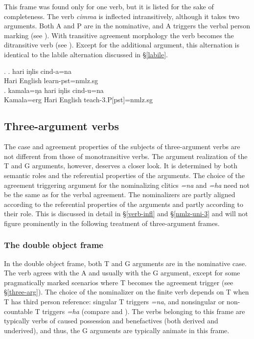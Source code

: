 
\noindent
This frame was found only for one verb, but it is listed for the sake of completeness. The verb \emph{cimma}  is inflected intransitively, although it takes two arguments. Both A and P are in the nominative, and  A triggers the verbal person marking (see  \Next[a]). With transitive agreement morphology the verb becomes the ditransitive verb  (see \Next[b]). Except for the additional argument, this alternation is identical to the labile alternation discussed in §\ref{labile}. 

\ex. \ag. hari iŋlis cind-a=na\\
		Hari English learn{\sc [3sg]-pst=nmlz.sg}	\\
 	\bg. kamala=ŋa hari iŋlis cind-u=na\\
	Kamala{\sc =erg} Hari English teach{\sc -3.P[pst]=nmlz.sg}		\\

\subsection{Three-argument verbs}\label{three-arg-frame}

The case and agreement properties of the subjects of three-argument verbs are not different from those of monotransitive verbs. The argument realization of the T and G arguments, however, deserves a closer look. It is determined  by both semantic roles and the referential properties of the arguments.  The choice of the agreement triggering argument for the nominalizing clitics \emph{=na} and \emph{=ha} need not be the same as for the verbal agreement. The nominalizers are partly aligned according to the referential properties of the arguments and partly according to their role. This is discussed in detail in §\ref{verb-infl} and §\ref{nmlz-uni-3} and will not figure prominently in the following treatment of three-argument frames.
 
\subsubsection{The double object frame}


\noindent
In the double object frame, both T and G arguments are in the nominative case. The verb agrees with the A and usually with the G argument, except for some pragmatically marked scenarios where T becomes the agreement trigger (see §\ref{three-arg}). The choice of the nominalizer on the finite verb depends on T when T has third person reference: singular T triggers \emph{=na}, and nonsingular or non-countable T triggers \emph{=ha} (compare \Next[b] and \Next[c]). The verbs belonging to this frame are typically verbs of caused possession and benefactives (both derived and underived), and thus, the G arguments are typically animate in this frame.
 
